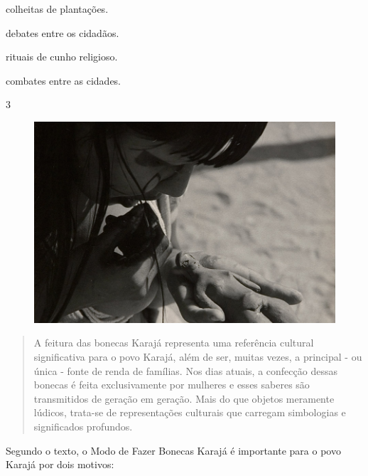 \begin{minipage}{.5\textwidth}
\begin{escolha}
\item colheitas de plantações.

\item debates entre os cidadãos.

\item rituais de cunho religioso.

\item combates entre as cidades.
\end{escolha}
\end{minipage}

\pagebreak
\num{3}

\begin{figure}[htpb!]
\includegraphics[width=\textwidth]{./imgs/img44.png}
\end{figure}

\begin{quote}
A feitura das bonecas Karajá representa uma referência cultural significativa para o povo Karajá, além de ser, muitas vezes, a principal - ou única - fonte de renda de famílias. Nos dias atuais, a confecção dessas bonecas é feita exclusivamente por mulheres e esses saberes são transmitidos de geração em geração. Mais do que objetos meramente lúdicos, trata-se de representações culturais que carregam simbologias e significados profundos.
\end{quote}

Segundo o texto, o Modo de Fazer Bonecas Karajá é importante para o povo
Karajá por dois motivos:

